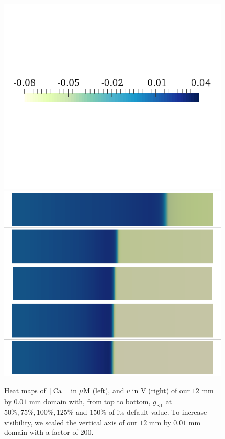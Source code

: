 \documentclass{article}
\begin{document}
\begin{figure}
\begin{minipage}{0.5\textwidth}
\includegraphics[trim=0cm 7cm 0cm 6cm, clip=true, width=1\linewidth]{legend_v2}
\includegraphics[trim=0cm 0cm 0cm 0cm, clip=true, width=1\linewidth]{v_gk1}
    \end{minipage}
    \caption{Heat maps of $[\mathrm{Ca}]_{\mathrm{i}}$ in $\mu$M (left), and $v$ in V (right) of our $12$ mm by $0.01$ mm domain with, from top to bottom, $g_{\mathrm{K1}}$ at $50\%, 75\%, 100\%, 125\%$ and $150\%$ of its default value. To increase visibility, we scaled the vertical axis of our $12$ mm by $0.01$ mm domain with a factor of $200$.}
    \label{fig:1d}
\end{figure}
\end{document}
